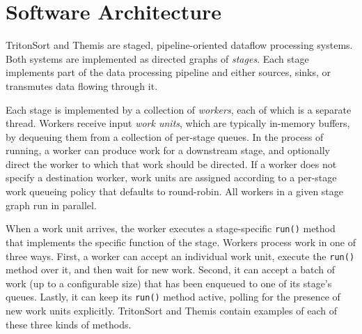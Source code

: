 \section{Software Architecture}

TritonSort and Themis are staged, pipeline-oriented dataflow processing
systems. Both systems are implemented as directed graphs of \emph{stages}. Each
stage implements part of the data processing pipeline and either sources,
sinks, or transmutes data flowing through it.

Each stage is implemented by a collection of \emph{workers}, each of which is a
separate thread. Workers receive input \emph{work units}, which are typically
in-memory buffers, by dequeuing them from a collection of per-stage queues. In
the process of running, a worker can produce work for a downstream stage, and
optionally direct the worker to which that work should be directed. If a worker
does not specify a destination worker, work units are assigned according to a
per-stage work queueing policy that defaults to round-robin. All workers in a
given stage graph run in parallel.

When a work unit arrives, the worker executes a stage-specific \texttt{run()}
method that implements the specific function of the stage. Workers process work
in one of three ways. First, a worker can accept an individual work unit,
execute the \texttt{run()} method over it, and then wait for new work. Second,
it can accept a batch of work (up to a configurable size) that has been
enqueued to one of its stage's queues. Lastly, it can keep its \texttt{run()}
method active, polling for the presence of new work units
explicitly. TritonSort and Themis contain examples of each of these three kinds
of methods.
